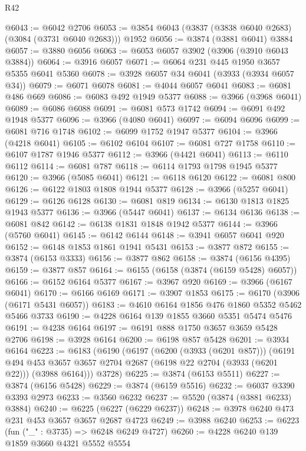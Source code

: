 \begin{lexlean}{R42}
\begin{coremodule}
@6043 := @6042 @2706
@6053 := @3854 @6043 (@3837 (@3838 @6040 @2683) (@3084 (@3731 @6040 @2683))) @1952
@6056 := @3874 (@3881 @6041) @3884
@6057 := @3880 @6056
@6063 := @6053 @6057 @3902 (@3906 (@3910 @6043 @3884))
@6064 := @3916 @6057
@6071 := @6064 @231 @445 @1950 @3657 @5355 @6041 @5360
@6078 := @3928 @6057 @34 @6041 (@3933 (@3934 @6057 @34))
@6079 := @6071 @6078
@6081 := @4044 @6057 @6041
@6083 := @6081 @486 @669
@6086 := @6083 @492 @1949 @5377
@6088 := @3966 (@3968 @6041)
@6089 := @6086 @6088
@6091 := @6081 @573 @1742
@6094 := @6091 @492 @1948 @5377
@6096 := @3966 (@4080 @6041)
@6097 := @6094 @6096
@6099 := @6081 @716 @1748
@6102 := @6099 @1752 @1947 @5377
@6104 := @3966 (@4218 @6041)
@6105 := @6102 @6104
@6107 := @6081 @727 @1758
@6110 := @6107 @1787 @1946 @5377
@6112 := @3966 (@4421 @6041)
@6113 := @6110 @6112
@6114 := @6081 @787
@6118 := @6114 @1793 @1798 @1945 @5377
@6120 := @3966 (@5085 @6041)
@6121 := @6118 @6120
@6122 := @6081 @800
@6126 := @6122 @1803 @1808 @1944 @5377
@6128 := @3966 (@5257 @6041)
@6129 := @6126 @6128
@6130 := @6081 @819
@6134 := @6130 @1813 @1825 @1943 @5377
@6136 := @3966 (@5447 @6041)
@6137 := @6134 @6136
@6138 := @6081 @842
@6142 := @6138 @1831 @1848 @1942 @5377
@6144 := @3966 (@5760 @6041)
@6145 := @6142 @6144
@6148 := @3941 @6057 @6041 @920
@6152 := @6148 @1853 @1861 @1941 @5431
@6153 := @3877 @872
@6155 := @3874 (@6153 @3333)
@6156 := @3877 @862
@6158 := @3874 (@6156 @4395)
@6159 := @3877 @857
@6164 := @6155 (@6158 (@3874 (@6159 @5428) @6057))
@6166 := @6152 @6164 @5377
@6167 := @3967 @920
@6169 := @3966 (@6167 @6041)
@6170 := @6166 @6169
@6171 := @3907 @1853
@6175 := @6170 (@3906 (@6171 @5431 @6057))
@6183 := @4610 @6164 @1856 @476 @1860 @5352 @5462 @5466 @3733
@6190 := @4228 @6164 @139 @1855 @3660 @5351 @5474 @5476
@6191 := @4238 @6164
@6197 := @6191 @888 @1750 @3657 @3659 @5428 @2706
@6198 := @3928 @6164
@6200 := @6198 @857 @5428
@6201 := @3934 @6164
@6223 := @6183
    (@6190
      (@6197
        (@6200 (@3933 (@6201 @857)))
        (@6191
          @494
          @453
          @3657
          @3657
          @2704
          @2687
          (@6198 @22 @2704 (@3933 (@6201 @22)))
          (@3988 @6164)))
      @3728)
@6225 := @3874 (@6153 @5511)
@6227 := @3874 (@6156 @5428)
@6229 := @3874 (@6159 @5516)
@6232 := @6037 @3390 @3393 @2973
@6233 := @3560 @6232
@6237 := @5520 (@3874 (@3881 @6233) @3884)
@6240 := @6225 (@6227 (@6229 @6237))
@6248 := @3978 @6240 @473 @231 @453 @3657 @3657 @2687 @4723
@6249 := @3988 @6240
@6253 := @6223 (fun ("_" : @3735) => @6248 @6249 @4727)
@6260 := @4228 @6240 @139 @1859 @3660 @4321 @5552 @5554

\end{coremodule}
\end{lexlean}
